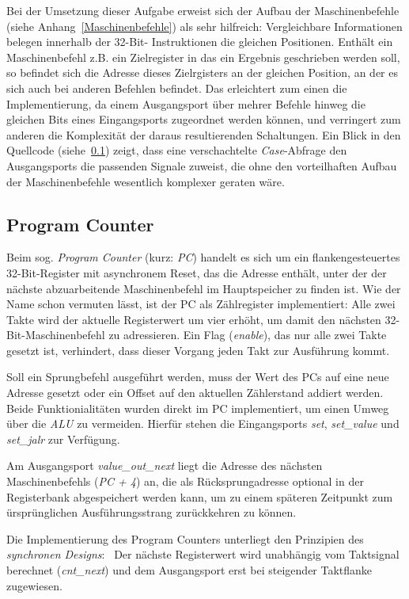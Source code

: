Bei der Umsetzung dieser Aufgabe erweist sich der Aufbau der Maschinenbefehle (siehe Anhang~\ref{Maschinenbefehle}) als sehr hilfreich:
Vergleichbare Informationen belegen innerhalb der 32-Bit- Instruktionen die gleichen Positionen.
Enthält ein Maschinenbefehl z.B. ein Zielregister in das ein Ergebnis geschrieben werden soll, so befindet sich die Adresse dieses Zielrgisters an der gleichen Position, an der es sich auch bei anderen Befehlen befindet.
Das erleichtert zum einen die Implementierung, da einem Ausgangsport über mehrer Befehle hinweg die gleichen Bits eines Eingangsports zugeordnet werden können, und verringert zum anderen die Komplexität der daraus resultierenden Schaltungen. 
Ein Blick in den Quellcode (siehe~\ref{}) zeigt, dass eine verschachtelte \textit{Case}-Abfrage den Ausgangsports die passenden Signale zuweist, die ohne den vorteilhaften Aufbau der Maschinenbefehle wesentlich komplexer geraten wäre.

\subsection{Program Counter}

Beim sog. \textit{Program Counter} (kurz: \textit{PC}) handelt es sich um ein flankengesteuertes 32-Bit-Register mit asynchronem Reset, das die Adresse enthält, unter der der nächste abzuarbeitende Maschinenbefehl im Hauptspeicher zu finden ist. 
Wie der Name schon vermuten lässt, ist der PC als Zählregister implementiert:
Alle zwei Takte wird der aktuelle Registerwert um vier erhöht, um damit den nächsten 32-Bit-Maschinenbefehl zu adressieren.
Ein Flag (\textit{enable}), das nur alle zwei Takte gesetzt ist, verhindert, dass dieser Vorgang jeden Takt zur Ausführung kommt.

Soll ein Sprungbefehl ausgeführt werden, muss der Wert des PCs auf eine neue Adresse gesetzt oder ein Offset auf den aktuellen Zählerstand addiert werden.
Beide Funktionialitäten wurden direkt im PC implementiert, um einen Umweg über die \textit{ALU} zu vermeiden.
Hierfür stehen die Eingangsports \textit{set}, \textit{set\_value} und \textit{set\_jalr} zur Verfügung.

Am Ausgangsport \textit{value\_out\_next} liegt die Adresse des nächsten Maschinenbefehls (\textit{PC + 4}) an, die als Rücksprungadresse optional in der Registerbank abgespeichert werden kann, um zu einem späteren Zeitpunkt zum ürsprünglichen Ausführungsstrang zurückkehren zu können.

Die Implementierung des Program Counters unterliegt den Prinzipien des \textit{synchronen Designs}:~\cite[S. 72 ff.]{Chu}
Der nächste Registerwert wird unabhängig vom Taktsignal berechnet (\textit{cnt\_next}) und dem Ausgangsport erst bei steigender Taktflanke zugewiesen. 


